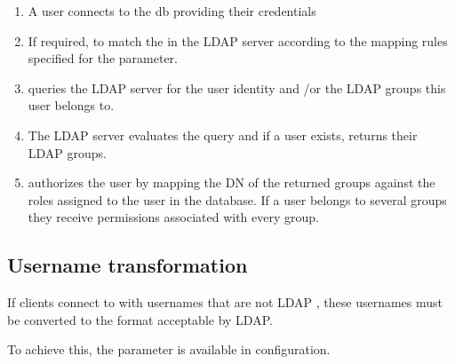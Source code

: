 \documentclass[letterpaper,10pt,english]{sphinxmanual}
\begin{document}
\noindent{}
\begin{enumerate}
%
\item {} 
\sphinxAtStartPar
A user connects to the db providing their credentials

\item {} 
\sphinxAtStartPar
If required,  {\hyperref[\detokenize{authorization:usertodnmapping}]{}} to match the  in the LDAP server according to the mapping rules specified for the  parameter.

\item {} 
\sphinxAtStartPar
{} queries the LDAP server for the user identity and /or the LDAP groups this user belongs to.

\item {} 
\sphinxAtStartPar
The LDAP server evaluates the query and if a user exists, returns their LDAP groups.

\item {} 
\sphinxAtStartPar
{} authorizes the user by mapping the DN of the returned groups against the roles assigned to the user in the  database.  If a user belongs to several groups they receive permissions associated with every group.

\end{enumerate}


\subsection{Username transformation}
\label{\detokenize{authorization:username-transformation}}\label{\detokenize{authorization:usertodnmapping}}
\sphinxAtStartPar
If clients connect to  with usernames that are not LDAP , these usernames must be converted to the format acceptable by LDAP.

\sphinxAtStartPar
To achieve this,  the  parameter is available in  configuration.
\end{document}
